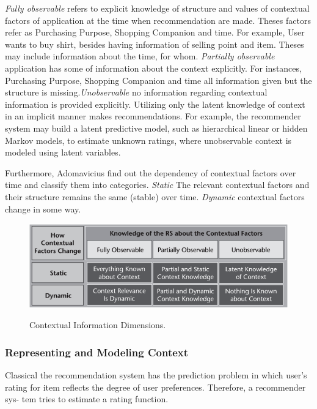 \textit{Fully observable} refers to explicit knowledge of structure and values of contextual factors of application at the time when recommendation are made. Theses factors refer as Purchasing Purpose, Shopping Companion and time. For example, User wants to buy shirt, besides having information of selling point and item. Theses may include information about the time, for whom. \textit{Partially observable} application has some of information about the context explicitly. For instances, Purchasing Purpose, Shopping Companion and time all information given but the structure is missing.\textit{Unobservable} no information regarding contextual information is provided explicitly. Utilizing only the latent knowledge of context in an implicit manner makes recommendations. For example, the recommender system may build a latent predictive model, such as hierarchical linear or hidden Markov models, to estimate unknown ratings, where unobservable context is modeled using latent variables.\newline

Furthermore, Adomavicius \cite{adomavicius2011context} find out the dependency of contextual factors over time and classify them into categories. \textit{Static} The relevant contextual factors and their structure remains the same (stable) over time. \textit{Dynamic} contextual factors change in some way.

\begin{figure}[h]
	\centering
	\includegraphics[width=.98\linewidth]{figures/ch2_context_dimensions.png}
	\caption{Contextual Information Dimensions.} 
	\cite{adomavicius2011context}
	\label{fig:ch2_context_dimensions}
\end{figure}

\subsubsection{Representing and Modeling Context}

Classical the recommendation system has the prediction problem in which user’s rating for item reflects the degree of user preferences. Therefore, a recommender sys- tem tries to estimate a rating function.

